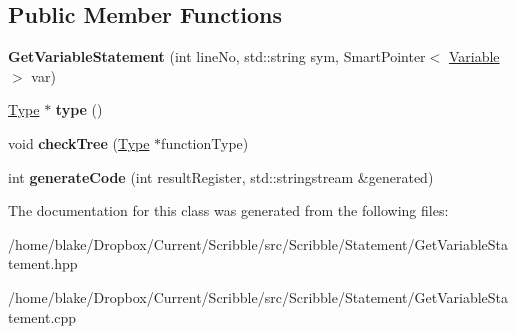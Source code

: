 \subsection*{Public Member Functions}
\begin{DoxyCompactItemize}
\item 
\hypertarget{class_scribble_core_1_1_get_variable_statement_a2dd1671cca524e106bfa0ee6f6066aee}{{\bfseries Get\-Variable\-Statement} (int line\-No, std\-::string sym, Smart\-Pointer$<$ \hyperlink{class_scribble_core_1_1_variable}{Variable} $>$ var)}\label{class_scribble_core_1_1_get_variable_statement_a2dd1671cca524e106bfa0ee6f6066aee}

\item 
\hypertarget{class_scribble_core_1_1_get_variable_statement_ad2b6ae50fac383c27217c6660c9826dc}{\hyperlink{class_scribble_core_1_1_type}{Type} $\ast$ {\bfseries type} ()}\label{class_scribble_core_1_1_get_variable_statement_ad2b6ae50fac383c27217c6660c9826dc}

\item 
\hypertarget{class_scribble_core_1_1_get_variable_statement_ade323d3f4af74fb2b94e077afaa7aadd}{void {\bfseries check\-Tree} (\hyperlink{class_scribble_core_1_1_type}{Type} $\ast$function\-Type)}\label{class_scribble_core_1_1_get_variable_statement_ade323d3f4af74fb2b94e077afaa7aadd}

\item 
\hypertarget{class_scribble_core_1_1_get_variable_statement_ad4951a090b1ba4209c0ec310a9f7f48b}{int {\bfseries generate\-Code} (int result\-Register, std\-::stringstream \&generated)}\label{class_scribble_core_1_1_get_variable_statement_ad4951a090b1ba4209c0ec310a9f7f48b}

\end{DoxyCompactItemize}


The documentation for this class was generated from the following files\-:\begin{DoxyCompactItemize}
\item 
/home/blake/\-Dropbox/\-Current/\-Scribble/src/\-Scribble/\-Statement/Get\-Variable\-Statement.\-hpp\item 
/home/blake/\-Dropbox/\-Current/\-Scribble/src/\-Scribble/\-Statement/Get\-Variable\-Statement.\-cpp\end{DoxyCompactItemize}
